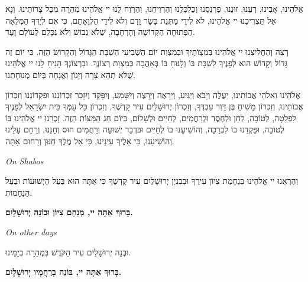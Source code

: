 אֱלֹהֵינוּ, אָבִינוּ, רְעֵנוּ, זוּנֵנוּ, פַרְנְסֵנוּ וְכַלְכְּלֵנוּ וְהַרְוִיחֵנוּ, וְהַרְוַח לָנוּ יי אֱלֹהֵינוּ מְהֵרָה מִכָּל צָרוֹתֵינוּ. וְנָא אַל תַּצְרִיכֵנוּ יי אֱלֹהֵינוּ, לֹא לִידֵי מַתְּנַת בָּשָׂר וָדָם וְלֹא לִידֵי הַלְוָאָתָם, כִּי אִם לְיָדְךָ הַמְּלֵאָה הַפְּתוּחָה הַקְּדוֹשָׁה וְהָרְחָבָה, שֶׁלֹא נֵבוֹשׁ וְלֹא נִכָּלֵם לְעוֹלָם וָעֶד.

\begin{framed}

רְצֵה וְהַחֲלִיצֵנוּ יי אֱלֹהֵינוּ בְּמִצְוֹתֶיךָ וּבְמִצְוַת יוֹם הַשְׁבִיעִי הַשַׁבָּת הַגָּדוֹל וְהַקָדוֹשׂ הַזֶּה. כִּי יוֹם זֶה גָּדוֹל וְקָדוֹשׁ הוּא לְפָנֶיךָ לִשְׁבָּת בּוֹ וְלָנוּחַ בּוֹ בְּאַהֲבָה כְּמִצְוַת רְצוֹנֶךָ. וּבִרְצוֹנְךָ הָנִיחַ לָנוּ יי אֱלֹהֵינוּ שֶׁלֹּא תְהֵא צָרָה וְיָגוֹן וַאֲנָחָה בְּיוֹם מְנוּחָתֵנוּ.
\end{framed}

\vspace{1em}

אֱלֹהֵינוּ וֵאלֹהֵי אֲבוֹתֵינוּ, יַעֲלֶה וְיָבֹא וְיַגִּיעַ, וְיֵרָאֶה וְיֵרָצֶה וְיִשָּׁמַע, וְיִפָּקֵד וְיִזָּכֵר זִכְרוֹנֵנוּ וּפִקְדוֹנֵנוּ וְזִכְרוֹן אֲבוֹתֵינוּ, וְזִכְרוֹן מָשִׁיחַ בֶּן דָּוִד עַבְדֶּךָ, וְזִכְרוֹן יְרוּשָׁלַיִם עִיר קָדְשֶׁךָ, וְזִכְרוֹן כָּל עַמְּךָ בֵּית יִשְׂרָאֵל לְפָנֶיךָ לִפְלֵטָה, לְטוֹבָה, לְחֵן וּלְחֶסֶד וּלְרַחֲמִים, לְחַיִּים וּלְשָׁלוֹם, בְּיוֹם חַג הַמַּצּוֹת הַזֶה. זָכְרֵנוּ יי אֱלֹהֵינוּ בּוֹ לְטוֹבָה, וּפָּקְדֵנוּ בוֹ לִבְרָכָה, וְהוֹשִׁיעֵנוּ בוֹ לְחַיִּים וּבּדְבַר יְשׁוּעָה וְרַחֲמִים חוּס וְחָנֵּנוּ, וְרַחֵם עָלֵינוּ וְהוֹשִׁיעֵנוּ, כִּי אֵלֶיךָ עֵינֵינוּ, כִּי אֵל מֶלֶךְ חַנּוּן וְרַחוּם אָתָּה.

\vspace{1em}

\begin{minipage}{0.66\linewidth}
\begin{english}\hfill{\itshape On Shabos}\end{english}

וְהַרְאֵנוּ יי אֱלֹהֵינוּ בְּנֶחָמַת צִיוֹן עִירֶךָ וּבְבִנְיַן יְרוּשָׁלַיִם עִיר קָדְשֶׁךָ כִּי אַתָּה הוּא בַּעַל הַיְשׁוּעוֹת וּבַעַל הַנֶּחָמוֹת. 

\begin{center}
{\large \bfseries
בָּרוּךְ אַתָּה יי, מְנַחֵם צִיּוֹן וּבוֹנֵה יְרוּשָׁלָיִם.
}\end{center}
\end{minipage}\hspace{0.01\linewidth}\vrule{}\hspace{0.01\linewidth}
\begin{minipage}{0.30\linewidth}
\begin{english}\hfill{\itshape On other days}\end{english}

וּבְנֵה יְרוּשָׁלַיִם עִיר הַקֹּדֶשׁ בִּמְהֵרָה בְיָמֵינוּ. 
\begin{center}
{\large \bfseries
בָּרוּךְ אַתָּה יי, בּוֹנֵה בְרַחֲמָיו יְרוּשָׁלָיִם.
}\end{center}
\end{minipage}

